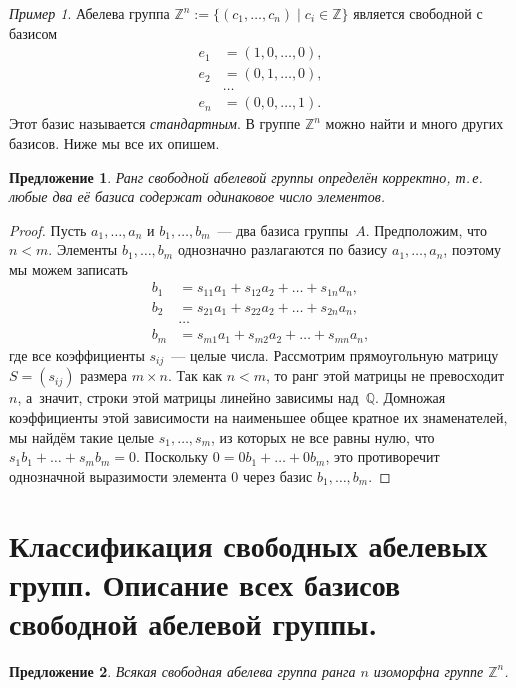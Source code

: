 \documentclass[a4paper, 12pt]{article}
\def\ZZ{{\mathbb Z}}%
\def\QQ{{\mathbb Q}}%
\newtheorem{proposition}{Предложение}
\theoremstyle{definition}
\theoremstyle{remark}
\newtheorem{example}{Пример}
\begin{document}
\begin{example}
Абелева группа $\ZZ^n:=\{(c_1,\ldots,c_n) \mid c_i\in\ZZ\}$ является
свободной с базисом
$$
\begin{aligned}
e_1 &= (1,0,\ldots,0), \\
e_2 &= (0,1,\ldots,0),\\
 &\ldots \\
e_n &= (0,0,\ldots,1).
\end{aligned}
$$
Этот базис называется {\it стандартным}. В группе $\ZZ^n$ можно
найти и много других базисов. Ниже мы все их опишем.
\end{example}

\begin{proposition}
Ранг свободной абелевой группы определён корректно, т.\,е. любые два
её базиса содержат одинаковое число элементов.
\end{proposition}

\begin{proof}
Пусть $a_1, \ldots, a_n$ и $b_1, \ldots, b_m$~--- два базиса
группы~$A$. Предположим, что $n < m$. Элементы $b_1, \ldots, b_m$
однозначно разлагаются по базису $a_1, \ldots, a_n$, поэтому мы
можем записать
$$
\begin{aligned}
b_1 &= s_{11}a_1 + s_{12}a_2 + \ldots + s_{1n}a_n, \\
b_2 &= s_{21}a_1 + s_{22}a_2 + \ldots + s_{2n}a_n,\\
 &\ldots \\
b_m &= s_{m1}a_1 + s_{m2}a_2 + \ldots + s_{mn}a_n,
\end{aligned}
$$
где все коэффициенты $s_{ij}$~--- целые числа. Рассмотрим
прямоугольную матрицу $S = (s_{ij})$ размера $m \times n$. Так как
$n < m$, то ранг этой матрицы не превосходит~$n$, а~значит, строки
этой матрицы линейно зависимы над~$\QQ$. Домножая коэффициенты этой
зависимости на наименьшее общее кратное их знаменателей, мы найдём
такие целые $s_1, \ldots, s_m$, из которых не все равны нулю, что
$s_1 b_1 + \ldots + s_m b_m=0$. Поскольку $0 = 0b_1 + \ldots +
0b_m$, это противоречит однозначной выразимости элемента $0$ через
базис $b_1, \ldots, b_m$.
\end{proof}


\section{Классификация свободных абелевых групп. Описание всех базисов свободной абелевой группы.}

\begin{proposition}
Всякая свободная абелева группа ранга $n$ изоморфна группе $\ZZ^n$.
\end{proposition}
\end{document}
